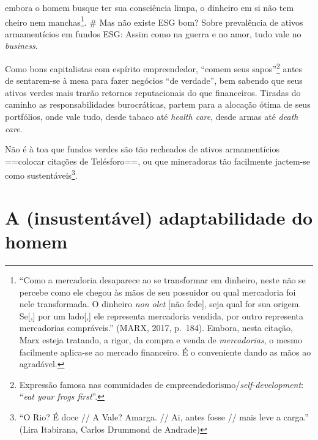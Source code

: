 embora o homem busque ter sua consciência limpa, o dinheiro em si não
tem cheiro nem manchas\footnote{``Como a mercadoria desaparece ao se
  transformar em dinheiro, neste não se percebe como ele chegou às mãos
  de seu possuidor ou qual mercadoria foi nele transformada. O dinheiro
  \emph{non olet} {[}não fede{]}, seja qual for sua origem. Se{[},{]}
  por um lado{[},{]} ele representa mercadoria vendida, por outro
  representa mercadorias compráveis.'' (MARX, 2017, p.~184). Embora,
  nesta citação, Marx esteja tratando, a rigor, da compra e venda de
  \emph{mercadorias}, o mesmo facilmente aplica-se ao mercado
  financeiro. É o conveniente dando as mãos ao agradável.}. \# Mas não
existe ESG bom? Sobre prevalência de ativos armamentícios em fundos ESG:
Assim como na guerra e no amor, tudo vale no \emph{business}.

Como bons capitalistas com espírito empreendedor, ``comem seus
sapos''\footnote{Expressão famosa nas comunidades de
  empreendedorismo/\emph{self-development}: ``\emph{eat your frogs
  first}''.} antes de sentarem-se à mesa para fazer negócios ``de
verdade'', bem sabendo que seus ativos verdes mais trarão retornos
reputacionais do que financeiros. Tiradas do caminho as
responsabilidades burocráticas, partem para a alocação ótima de seus
portfólios, onde vale tudo, desde tabaco até \emph{health care}, desde
armas até \emph{death care}.

Não é à toa que fundos verdes são tão recheados de ativos armamentícios
==colocar citações de Telésforo==, ou que mineradoras tão facilmente
jactem-se como sustentáveis\footnote{``O Rio? É doce // A Vale? Amarga.
  // Ai, antes fosse // mais leve a carga.'' (Lira Itabirana, Carlos
  Drummond de Andrade)}.

\hypertarget{a-insustentuxe1vel-adaptabilidade-do-homem}{%
\section{A (insustentável) adaptabilidade do
homem}\label{a-insustentuxe1vel-adaptabilidade-do-homem}}

